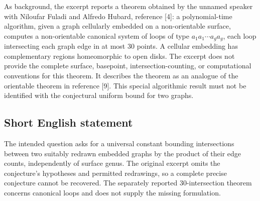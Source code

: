 \documentclass[11pt]{article}
\begin{document}
As background, the excerpt reports a theorem obtained by the unnamed speaker with Niloufar Fuladi and Alfredo Hubard, reference [4]: a polynomial-time algorithm, given a graph cellularly embedded on a non-orientable surface, computes a non-orientable canonical system of loops of type \(a_1a_1\cdots a_ga_g\), each loop intersecting each graph edge in at most \(30\) points. A cellular embedding has complementary regions homeomorphic to open disks. The excerpt does not provide the complete surface, basepoint, intersection-counting, or computational conventions for this theorem. It describes the theorem as an analogue of the orientable theorem in reference [9]. This special algorithmic result must not be identified with the conjectural uniform bound for two graphs.
\subsection{Short English statement}
The intended question asks for a universal constant bounding intersections between two suitably redrawn embedded graphs by the product of their edge counts, independently of surface genus. The original excerpt omits the conjecture's hypotheses and permitted redrawings, so a complete precise conjecture cannot be recovered. The separately reported \(30\)-intersection theorem concerns canonical loops and does not supply the missing formulation.
\end{document}
